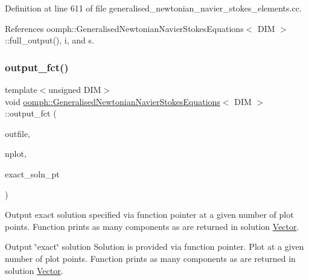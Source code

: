 Definition at line 611 of file generalised\+\_\+newtonian\+\_\+navier\+\_\+stokes\+\_\+elements.\+cc.



References oomph\+::\+Generalised\+Newtonian\+Navier\+Stokes\+Equations$<$ D\+I\+M $>$\+::full\+\_\+output(), i, and s.

\mbox{\label{classoomph_1_1GeneralisedNewtonianNavierStokesEquations_a1139ee45fa212ab52c9cb8e1e0ade323}} 
\subsubsection{\texorpdfstring{output\+\_\+fct()}{output\_fct()}\hspace{0.1cm}{\footnotesize\ttfamily [1/2]}}
{\footnotesize\ttfamily template$<$unsigned D\+IM$>$ \\
void \hyperlink{classoomph_1_1GeneralisedNewtonianNavierStokesEquations}{oomph\+::\+Generalised\+Newtonian\+Navier\+Stokes\+Equations}$<$ D\+IM $>$\+::output\+\_\+fct (\begin{DoxyParamCaption}\item[{std\+::ostream \&}]{outfile,  }\item[{const unsigned \&}]{nplot,  }\item[{\hyperlink{classoomph_1_1FiniteElement_a690fd33af26cc3e84f39bba6d5a85202}{Finite\+Element\+::\+Steady\+Exact\+Solution\+Fct\+Pt}}]{exact\+\_\+soln\+\_\+pt }\end{DoxyParamCaption})\hspace{0.3cm}{\ttfamily [virtual]}}



Output exact solution specified via function pointer at a given number of plot points. Function prints as many components as are returned in solution \hyperlink{classoomph_1_1Vector}{Vector}. 

Output \char`\"{}exact\char`\"{} solution Solution is provided via function pointer. Plot at a given number of plot points. Function prints as many components as are returned in solution \hyperlink{classoomph_1_1Vector}{Vector}. 

